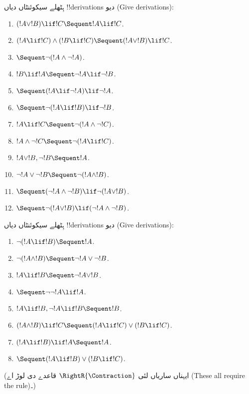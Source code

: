\documentclass[../../../include/open-logic-section]{subfiles}
\begin{document}
\begin{prob}
ہِٹھلے سیکوئنٹاں دیاں !!{derivation}s دیو (Give derivations):
\begin{enumerate}
\item $(!A \lor !B) \lif !C \Sequent !A \lif !C$.
\item $(!A \lif !C) \land (!B \lif !C) \Sequent (!A \lor !B) \lif !C$.
\item $\Sequent \lnot(!A \land \lnot !A)$.
\item $!B \lif !A \Sequent \lnot !A \lif \lnot !B$.
\item $\Sequent (!A \lif \lnot !A) \lif \lnot !A$.
\item $\Sequent \lnot(!A \lif !B) \lif \lnot !B$.
\item $!A \lif !C \Sequent \lnot (!A \land \lnot !C)$.
\item $!A \land \lnot !C \Sequent \lnot (!A \lif !C)$.
\item $!A \lor !B, \lnot !B \Sequent !A$.
\item $\lnot !A \lor \lnot !B \Sequent \lnot(!A \land !B)$.
\item $\Sequent (\lnot !A \land \lnot !B) \lif\lnot(!A \lor !B)$.
\item $\Sequent \lnot(!A \lor !B) \lif (\lnot !A \land \lnot !B)$.
\end{enumerate}
\end{prob}

\begin{prob}
ہِٹھلے سیکوئنٹاں دیاں !!{derivation}s دیو (Give derivations):
\begin{enumerate}
\item $\lnot(!A \lif !B) \Sequent !A$.
\item $\lnot(!A \land !B) \Sequent \lnot !A \lor \lnot !B$.
\item $!A \lif !B \Sequent \lnot !A \lor !B$.
\item $\Sequent \lnot \lnot !A \lif !A$.
\item $!A \lif !B, \lnot !A \lif !B \Sequent !B$.
\item $(!A \land !B) \lif !C \Sequent (!A \lif !C) \lor (!B \lif !C)$.
\item $(!A \lif !B) \lif !A \Sequent !A$.
\item $\Sequent (!A \lif !B) \lor (!B \lif !C)$.
\end{enumerate}
(ایہناں ساریاں لئی $\RightR{\Contraction}$ قاعدے دی لوڑ اے (These all require the rule)۔)
\end{prob}
\end{document}
